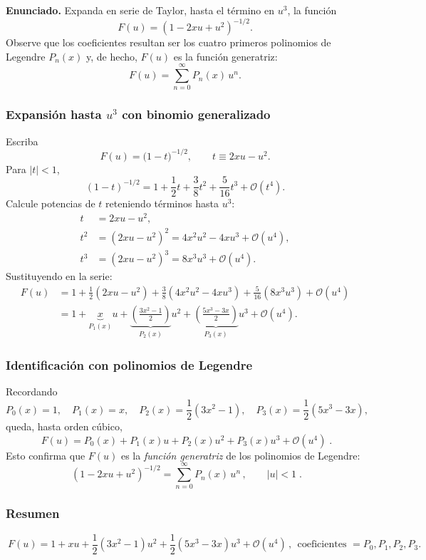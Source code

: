 \documentclass{article}
\begin{document}
\textbf{Enunciado.} Expanda en serie de Taylor, hasta el término en $u^{3}$, la función
\[
F(u)=(1-2xu+u^{2})^{-1/2}.
\]
Observe que los coeficientes resultan ser los cuatro primeros polinomios de Legendre $P_n(x)$ y, de hecho, $F(u)$ es la función generatriz:
\[
F(u)=\sum_{n=0}^{\infty}P_n(x)\,u^n.
\]

\subsubsection*{Expansión hasta $u^3$ con binomio generalizado}
Escriba
\[
F(u)=\big(1-t\big)^{-1/2},\qquad t\equiv 2xu-u^{2}.
\]
Para $|t|<1$,
\[
(1-t)^{-1/2}=1+\frac{1}{2}t+\frac{3}{8}t^{2}+\frac{5}{16}t^{3}+\mathcal O(t^{4}).
\]
Calcule potencias de $t$ reteniendo términos hasta $u^{3}$:
\[
\begin{aligned}
t&=2xu-u^{2},\\
t^{2}&=(2xu-u^{2})^{2}=4x^{2}u^{2}-4xu^{3}+\mathcal O(u^{4}),\\
t^{3}&=(2xu-u^{2})^{3}=8x^{3}u^{3}+\mathcal O(u^{4}).
\end{aligned}
\]
Sustituyendo en la serie:
\[
\begin{aligned}
F(u)
&=1+\frac{1}{2}(2xu-u^{2})
+\frac{3}{8}(4x^{2}u^{2}-4xu^{3})
+\frac{5}{16}(8x^{3}u^{3})
+\mathcal O(u^{4})\\[4pt]
&=1+\underbrace{x}_{\displaystyle P_{1}(x)}u
+\underbrace{\left(\frac{3x^{2}-1}{2}\right)}_{\displaystyle P_{2}(x)}u^{2}
+\underbrace{\left(\frac{5x^{3}-3x}{2}\right)}_{\displaystyle P_{3}(x)}u^{3}
+\mathcal O(u^{4}).
\end{aligned}
\]

\subsubsection*{Identificación con polinomios de Legendre}
Recordando
\[
P_{0}(x)=1,\quad P_{1}(x)=x,\quad
P_{2}(x)=\frac{1}{2}(3x^{2}-1),\quad
P_{3}(x)=\frac{1}{2}(5x^{3}-3x),
\]
queda, hasta orden cúbico,
\[
\boxed{\;
F(u)=P_{0}(x)+P_{1}(x)u+P_{2}(x)u^{2}+P_{3}(x)u^{3}+\mathcal O(u^{4})\;}.
\]
Esto confirma que $F(u)$ es la \emph{función generatriz} de los polinomios de Legendre:
\[
\boxed{\;
(1-2xu+u^{2})^{-1/2}=\displaystyle\sum_{n=0}^{\infty}P_{n}(x)\,u^{n}\,,\qquad |u|<1\;}.
\]

\subsubsection*{Resumen}
\[
\boxed{\
F(u)=1+xu+\frac{1}{2}(3x^{2}-1)u^{2}+\frac{1}{2}(5x^{3}-3x)u^{3}+\mathcal O(u^{4})\,,\ \ 
\text{coeficientes }=P_0,P_1,P_2,P_3.\
}
\]
\end{document}
